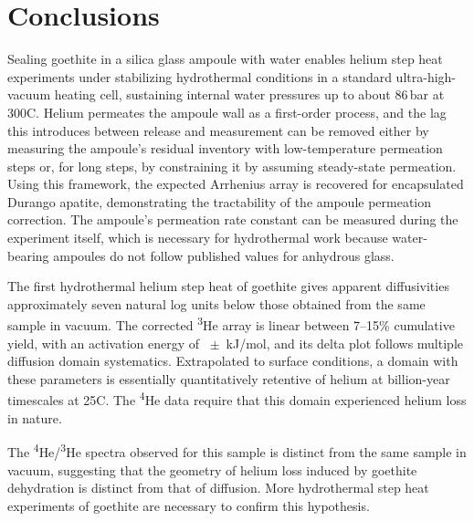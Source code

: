 \section{Conclusions}\label{sec:conclusions}

Sealing goethite in a silica glass ampoule with water enables helium step heat experiments under stabilizing hydrothermal conditions in a standard ultra-high-vacuum heating cell, sustaining internal water pressures up to about 86\,bar at 300\textdegree C. Helium permeates the ampoule wall as a first-order process, and the lag this introduces between release and measurement can be removed either by measuring the ampoule's residual inventory with low-temperature permeation steps or, for long steps, by constraining it by assuming steady-state permeation. Using this framework, the expected Arrhenius array is recovered for encapsulated Durango apatite, demonstrating the tractability of the ampoule permeation correction. The ampoule's permeation rate constant can be measured during the experiment itself, which is necessary for hydrothermal work because water-bearing ampoules do not follow published values for anhydrous glass.

The first hydrothermal helium step heat of goethite gives apparent diffusivities approximately seven natural log units below those obtained from the same sample in vacuum. The corrected \textsuperscript{3}He array is linear between 7--15\% cumulative yield, with an activation energy of \ChTwoEa\ $\pm$ \ChTwoEaErr\,kJ/mol, and its delta plot follows multiple diffusion domain systematics. Extrapolated to surface conditions, a domain with these parameters is essentially quantitatively retentive of helium at billion-year timescales at 25\textdegree C. The \textsuperscript{4}He data require that this domain experienced helium loss in nature. 

The \textsuperscript{4}He/\textsuperscript{3}He spectra observed for this sample is distinct from the same sample in vacuum, suggesting that the geometry of helium loss induced by goethite dehydration is distinct from that of diffusion. More hydrothermal step heat experiments of goethite are necessary to confirm this hypothesis.

